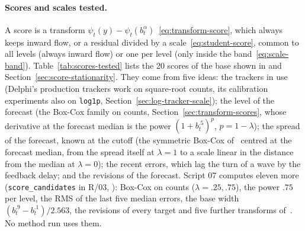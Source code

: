 \documentclass[11pt,a4paper]{article}
\theoremstyle{definition}
\theoremstyle{remark}
\begin{document}
\paragraph{Scores and scales tested.}
\label{sec:scores-tested}
A score is a transform $\psi_t(y)-\psi_t(b_t^\alpha)$~\eqref{eq:transform-score},
which always keeps inward flow, or a residual divided by a
scale~\eqref{eq:student-score}, common to all levels (always inward flow) or
one per level (only inside the band~\eqref{eq:scale-band}).
Table~\ref{tab:scores-tested} lists the 20 scores of the base shown in
 and Section~\ref{sec:score-stationarity}.
They come from five ideas: the trackers in use (Delphi's production trackers
work on square-root counts, its calibration experiments also on
\texttt{log1p}, Section~\ref{sec:log-tracker-scale}); the level of the
forecast (the Box-Cox family on counts, Section~\ref{sec:transform-scores},
whose derivative at the forecast median is the power $(1+b_t^{.5})^p$,
$p=1-\lambda$); the spread of the forecast, known at the cutoff (the
symmetric Box-Cox of~\cite{vst} centred at the forecast median, from the
spread itself at $\lambda=1$ to a scale linear in the distance from the
median at $\lambda=0$); the recent errors, which lag the turn of a wave by
the feedback delay; and the revisions of the forecast. Script 07 computes
eleven more (\texttt{score\_candidates} in R/03,
): Box-Cox on counts
($\lambda=.25,.75$), the power $.75$ per level, the RMS of the last five
median errors, the base width $(b_t^{.9}-b_t^{.1})/2.563$, the revisions of
every target and five further transforms of~\cite{vst}. No method run uses
them.
\end{document}
